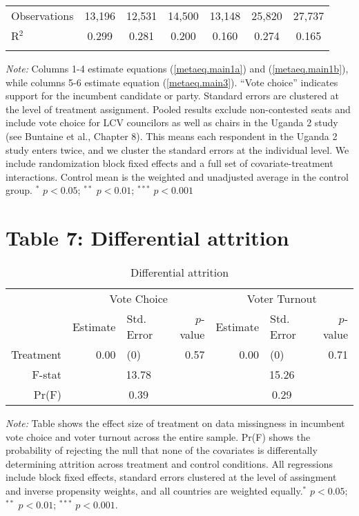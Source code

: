 \documentclass[]{article}
\begin{document}
\begin{table}[!htbp]
\begin{tabular}{@{\extracolsep{1pt}}lcccccc}
Observations & 13,196 & 12,531 & 14,500 & 13,148 & 25,820 & 27,737 \\ 
R$^{2}$ & 0.299 & 0.281 & 0.200 & 0.160 & 0.274 & 0.165 \\ 
\hline 
\hline \\[-1.8ex] 
\end{tabular} 
\begin{flushleft}\textit{Note:}  Columns 1-4 estimate equations (\ref{metaeq.main1a}) and (\ref{metaeq.main1b}), while columns 5-6 estimate equation (\ref{metaeq.main3}).  ``Vote choice'' indicates support for the incumbent candidate or party. Standard errors are clustered at the level of treatment assignment. Pooled results exclude non-contested seats and include vote choice for LCV councilors as well as chairs in the Uganda 2 study (see Buntaine et al., Chapter 8). This means each respondent in the Uganda 2 study enters twice, and we cluster the standard errors at the individual level. We include randomization block fixed effects and a full set of covariate-treatment interactions. Control mean is the weighted and unadjusted average in the control group. $^*$ $p<0.05$; $^{**}$ $p<0.01$; $^{***}$ $p<0.001$ \end{flushleft}
\end{table}

\clearpage

\section{Table 7: Differential
attrition}\label{table-7-differential-attrition}

\begin{table}[h!]
\caption{Differential attrition}
\centering
\begin{tabular}{rrlrrlr}
  \hline& \multicolumn{3}{c}{Vote Choice}&\multicolumn{3}{c}{Voter Turnout} \\
 & Estimate & Std. Error & $p$-value & Estimate & Std. Error & $p$-value \\ 
  \hline
Treatment & 0.00 & (0) & 0.57 & 0.00 & (0) & 0.71 \\ 
   \hline
F-stat & \multicolumn{3}{c}{13.78}&\multicolumn{3}{c}{15.26} \\
Pr(F) & \multicolumn{3}{c}{0.39}&\multicolumn{3}{c}{0.29} \\ \hline \hline
\end{tabular}
\begin{flushleft}\textit{Note:} Table shows the effect size of treatment on data missingness in incumbent vote choice and voter turnout across the entire sample. Pr(F) shows the probability of rejecting the null that none of the covariates is differentally determining attrition across treatment and control conditions. All regressions include block fixed effects, standard errors clustered at the level of assingment and inverse propensity weights, and all countries are weighted equally.$^*$ $p<0.05$; $^{**}$ $p<0.01$; $^{***}$ $p<0.001$. \end{flushleft}
\end{table}
\end{document}
